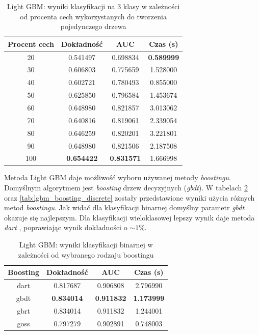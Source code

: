 \documentclass[a4paper, twoside, 11pt, openright]{article}
\begin{document}
\begin{table}[H]
    \centering
    \begin{tabular}{|c|c|c|c|}
    \hline
        \textbf{Procent cech} & \textbf{Dokładność} & \textbf{AUC} & \textbf{Czas (s)} \\ \hline
20          &  0.541497 &  0.698834 &    \textbf{0.589999} \\ \hline
30              &  0.606803 &  0.775659 &    1.528000 \\ \hline
40              &  0.602721 &  0.780493 &    0.855000 \\ \hline
50              &  0.625850 &  0.796584 &    1.453674 \\ \hline
60              &  0.648980 &  0.821857 &    3.013062 \\ \hline
70              &  0.640816 &  0.819061 &    2.339054 \\ \hline
80              &  0.646259 &  0.820201 &    3.221801 \\ \hline
90              &  0.648980 &  0.821506 &    2.187508 \\ \hline
100              &  \textbf{0.654422} &  \textbf{0.831571} &    1.666998 \\ \hline
    \end{tabular}
    \caption{Light GBM: wyniki klasyfikacji na 3 klasy w zależności od procenta cech wykorzystanych do tworzenia pojedynczego drzewa}
    \label{tab:lgbm_feature_fraction_discrete}
\end{table}

Metoda Light GBM daje możliwość wyboru używanej metody \textit{boostingu}. Domyślnym algorytmem jest \textit{boosting} drzew decyzyjnych (\textit{gbdt}). W tabelach \ref{tab:lgbm_boosting_binary} oraz \ref{tab:lgbm_boosting_discrete} zostały przedstawione wyniki użycia różnych metod \textit{boostingu}. Jak widać dla klasyfikacji binarnej domyślny parametr \textit{gbdt} okazuje się najlepszym. Dla klasyfikacji wieloklasowej lepszy wynik daje metoda \textit{dart} \cite{lightbgm:dart}, poprawiając wynik dokładności o $\sim 1\%$.

\begin{table}[H]
    \centering
    \begin{tabular}{|c|c|c|c|}
    \hline
        \textbf{Boosting} & \textbf{Dokładność} & \textbf{AUC} & \textbf{Czas (s)} \\ \hline
dart     &  0.817687 &  0.906808 &    2.796990 \\ \hline
gbdt     &  \textbf{0.834014} &  \textbf{0.911832} &    \textbf{1.173999} \\ \hline
gbrt     &  0.834014 &  0.911832 &    1.244001 \\ \hline
goss     &  0.797279 &  0.902891 &    0.748003 \\ \hline
    \end{tabular}
    \caption{Light GBM: wyniki klasyfikacji binarnej w zależności od wybranego rodzaju boostingu}
    \label{tab:lgbm_boosting_binary}
\end{table}
\end{document}
